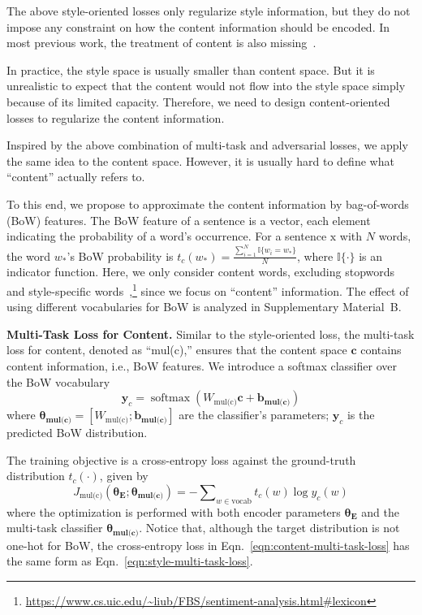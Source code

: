 \documentclass[11pt,a4paper]{article}
\newcommand{\rmx}{\mathrm x}
\newcommand{\loss}[1]{J_{\text{#1}}}
\newcommand{\nnweight}[1]{\bm{\theta_{\text{#1}}}}
\newcommand{\weight}[1]{W_{\text{#1}}}
\newcommand{\bias}[1]{\bm{b_{\text{#1}}}}
\begin{document}
The above style-oriented losses only regularize style information, but they do not impose any constraint on how the content information should be encoded. In most previous work, the treatment of content is also missing~\cite{hu2017toward,shen2017style,fu2018style}.

In practice, the style space is usually smaller than content space. But it is unrealistic to expect that the content would not flow into the style space simply because of its limited capacity. Therefore, we need to design content-oriented losses to regularize the content information.

Inspired by the above combination of multi-task and adversarial losses, we apply the same idea to the content space. However, it is usually hard to define what ``content'' actually refers to.

To this end, we propose to approximate the content information by bag-of-words (BoW) features.
The BoW feature of a sentence is a vector, each element indicating the probability of a word's occurrence.
For a sentence $\rmx$ with $N$ words, the word $w_*$'s BoW probability is
$t_c(w_*)=\frac{\sum_{i=1}^{N}{\mathbb{I}\{w_i = w_*\}}}{N}$,
where $\mathbb{I\{\cdot\}}$ is an indicator function.
Here, we only consider content words, excluding stopwords and style-specific words~\cite{hu2004mining},\footnote{\url{https://www.cs.uic.edu/~liub/FBS/sentiment-analysis.html\#lexicon}} since we focus on ``content'' information.
The effect of using different vocabularies for BoW is analyzed in Supplementary Material~B.

\textbf{Multi-Task Loss for Content.} Similar to the style-oriented loss, the multi-task loss for content, denoted as ``mul(c),'' ensures that the content space $\bm c$ contains content information, i.e., BoW features.
We introduce a softmax classifier over the BoW vocabulary
\begin{equation} \label{eqn:bow-pred}
	\bm y_c = \operatorname{softmax}({\weight{mul(c)}} \bm c + \bias{mul(c)})
\end{equation}
where $\nnweight{mul(c)}\!\!=\!\![\weight{mul(c)}; \bias{mul(c)}]$ are the classifier's parameters; $\bm y_c$ is the predicted BoW distribution.

The training objective is a cross-entropy loss against the ground-truth distribution $t_c(\cdot)$, given by
\begin{equation}\label{eqn:content-multi-task-loss}
	\loss{mul(c)}(\nnweight{E};\nnweight{mul(c)}) = -\!\! \sum\nolimits_{w\in\text{vocab}}\!\! t_c(w)\log y_c(w)
\end{equation}
where the optimization is performed with both encoder parameters $\nnweight{E}$ and the multi-task classifier $\nnweight{mul(c)}$.
Notice that, although the target distribution is not one-hot  for BoW, the cross-entropy loss in Eqn.~\ref{eqn:content-multi-task-loss} has the same form as Eqn.~\ref{eqn:style-multi-task-loss}.
\end{document}
